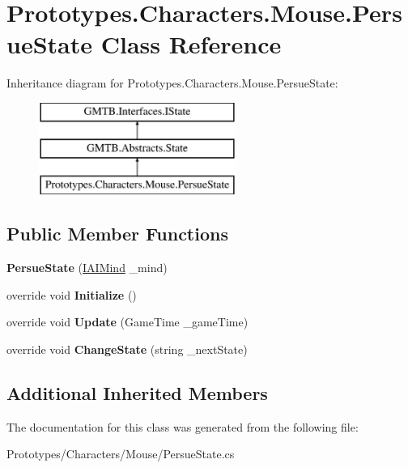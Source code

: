 \hypertarget{class_prototypes_1_1_characters_1_1_mouse_1_1_persue_state}{}\section{Prototypes.\+Characters.\+Mouse.\+Persue\+State Class Reference}
\label{class_prototypes_1_1_characters_1_1_mouse_1_1_persue_state}
Inheritance diagram for Prototypes.\+Characters.\+Mouse.\+Persue\+State\+:\begin{figure}[H]
\begin{center}
\leavevmode
\includegraphics[height=3.000000cm]{class_prototypes_1_1_characters_1_1_mouse_1_1_persue_state}
\end{center}
\end{figure}
\subsection*{Public Member Functions}
\begin{DoxyCompactItemize}
\item 
\mbox{\label{class_prototypes_1_1_characters_1_1_mouse_1_1_persue_state_aa84da2f458f1a0e55ffae33a9744dc98}} 
{\bfseries Persue\+State} (\mbox{\hyperlink{interface_g_m_t_b_1_1_interfaces_1_1_i_a_i_mind}{I\+A\+I\+Mind}} \+\_\+mind)
\item 
\mbox{\label{class_prototypes_1_1_characters_1_1_mouse_1_1_persue_state_a0ee4d9fa071ae7feeb8cfa98851b6e64}} 
override void {\bfseries Initialize} ()
\item 
\mbox{\label{class_prototypes_1_1_characters_1_1_mouse_1_1_persue_state_a9fe436adb5f0316ab8051cdf0150beaa}} 
override void {\bfseries Update} (Game\+Time \+\_\+game\+Time)
\item 
\mbox{\label{class_prototypes_1_1_characters_1_1_mouse_1_1_persue_state_a08d1a3f76f96a0940b2b7e6210606a17}} 
override void {\bfseries Change\+State} (string \+\_\+next\+State)
\end{DoxyCompactItemize}
\subsection*{Additional Inherited Members}


The documentation for this class was generated from the following file\+:\begin{DoxyCompactItemize}
\item 
Prototypes/\+Characters/\+Mouse/Persue\+State.\+cs\end{DoxyCompactItemize}
